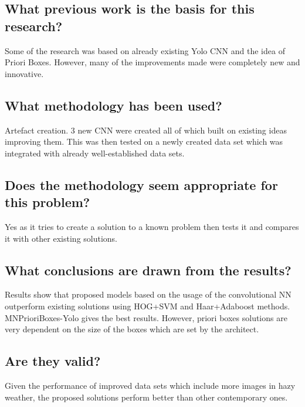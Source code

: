 \documentclass[11pt,a4paper]{article}
\begin{document}
\subsection*{What previous work is the basis for this research?}
Some of the research was based on already existing Yolo CNN and the idea of Priori Boxes. However, many of the improvements made were completely new and innovative.

\subsection*{What methodology has been used?}
Artefact creation. 3 new CNN were created all of which built on existing ideas improving them. This was then tested on a newly created data set which was integrated with already well-established data sets.

\subsection*{Does the methodology seem appropriate for this problem?}
Yes as it tries to create a solution to a known problem then tests it and compares it with other existing solutions.


\subsection*{What conclusions are drawn from the results?}
Results show that proposed models based on the usage of the convolutional NN outperform existing solutions using HOG+SVM and Haar+Adaboost methods. MNPrioriBoxes-Yolo gives the best results. However, priori boxes solutions are very dependent on the size of the boxes which are set by the architect.

\subsection*{Are they valid?}
Given the performance of improved data sets which include more images in hazy weather, the proposed solutions perform better than other contemporary ones.
\end{document}
